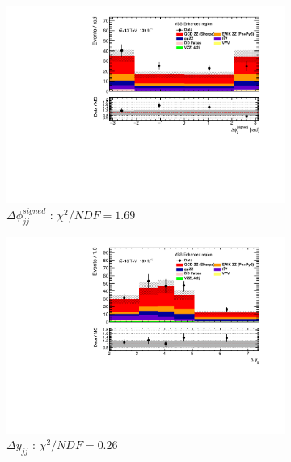\begin{figure}[!htbp]
\begin{subfigure}{.49\textwidth}
        \centering
        \includegraphics[width=.98\linewidth]{figures/Results/RecoDist_VBSEnhanced/reco_dphi_SR.pdf}
        \caption{ \footnotesize{$\Delta \phi _{jj}^{signed}$ }: $\chi^2/NDF = 1.69$ }
    \end{subfigure}
    \begin{subfigure}{.49\textwidth}
        \centering
        \includegraphics[width=.98\linewidth]{figures/Results/RecoDist_VBSEnhanced/reco_dy_SR.pdf}
        \caption{ \footnotesize{$\Delta y_{jj}$ }: $\chi^2/NDF = 0.26$ }
    \end{subfigure}\\
    \begin{subfigure}{.49\textwidth}
        \centering

\end{subfigure}
\end{figure}
